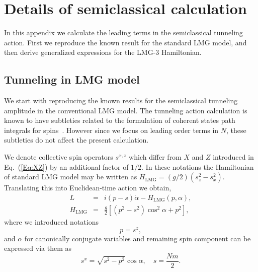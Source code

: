 \documentclass[aps,prx,showpacs,amsmath,amssymb,superscriptaddress,twocolumn,longbibliography,10pt,nofootinbib]{revtex4-2}
\renewcommand{\phi}{\alpha} %
\begin{document}
\appendix
\section{Details of semiclassical calculation \label{App:SC}}
In this appendix we calculate the leading terms in the semiclassical tunneling action. First we reproduce the known result for the standard LMG model, and then derive generalized expressions for the LMG-3 Hamiltonian.
\subsection{Tunneling in LMG model}
We start with reproducing the known results for the semiclassical tunneling amplitude in the conventional LMG model. The tunneling action calculation is known to have subtleties related to the formulation of coherent states path integrals for spins~\cite{Schilling1986,Grinstein92,Providencia1997,Stone03}. However since we focus on leading order terms in $N$, these subtleties do not affect the present calculation.  

We denote collective spin operators $s^{x,z}$ which differ from $X$ and $Z$ introduced in Eq.~(\ref{Eq:XZ}) by an additional factor of $1/2$. In these notations the Hamiltonian of standard LMG model may be written as $H_\text{LMG} =(g/2)(s_z^2-s_x^2)$. Translating this into Euclidean-time action we obtain, 
\begin{eqnarray}
    L &=&  i (p-s) \dot \phi - H_\text{LMG}(p,\phi), \label{Eq:L-def}
    \\
    H_\text{LMG} &=& \frac{g}{2}[(p^2-s^2)\cos^2\phi+p^2], \label{Eq:LMG}
\end{eqnarray}
where we introduced notations 
\begin{equation}\label{Eq:p-def}
p = s^z,
\end{equation}
and $\phi$ for canonically conjugate variables and remaining spin component can be expressed via them as 
\begin{equation} \label{Eq:sx-def}
    s^x = \sqrt{s^2-p^2} \cos\phi, 
    \quad
    s =  \frac{Nm}{2}.
\end{equation}
\end{document}
